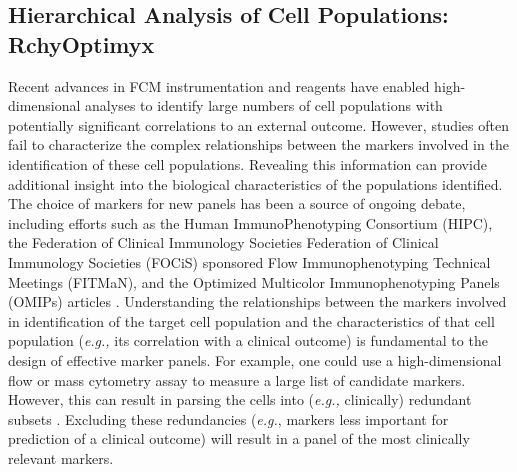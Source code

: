\subsection{Hierarchical Analysis of Cell Populations: RchyOptimyx}
Recent advances in FCM instrumentation and reagents  have enabled high-dimensional analyses to identify large numbers of  cell populations with potentially significant correlations to an external outcome.
However,  studies often fail to characterize the complex relationships between the markers involved in the  identification of these cell populations.
Revealing this information can provide additional insight into the biological characteristics of the populations identified.
The choice of markers for new panels has been a source of ongoing debate, including efforts such as the Human ImmunoPhenotyping Consortium (HIPC), the Federation of Clinical Immunology Societies Federation of Clinical Immunology Societies (FOCiS) sponsored Flow Immunophenotyping Technical Meetings (FITMaN), and the Optimized Multicolor Immunophenotyping Panels (OMIPs) articles \cite{Maecker2012Standardizing,roederer2010omips,mahnke2010omip,chattopadhyay2010omip,wei2011omip,biancotto2011omip,foulds2012omip,murdoch2012omip,eller2012omip,zuleger2012omip,lamoreaux2012omip,preijers2012omip}.
Understanding the relationships between the markers involved in identification of the target cell population and the characteristics of that cell population (\emph{e.g.,} its correlation with a clinical outcome) is fundamental to the design of effective marker panels. 
For example, one could use a high-dimensional flow or mass cytometry assay to measure a large list of candidate markers.
However, this can result in parsing the cells into (\emph{e.g.,} clinically) redundant subsets \cite{bendall2012deep}.
Excluding these redundancies (\emph{e.g.}, markers less important for prediction of a clinical outcome) will result in a panel of the most clinically relevant markers.


